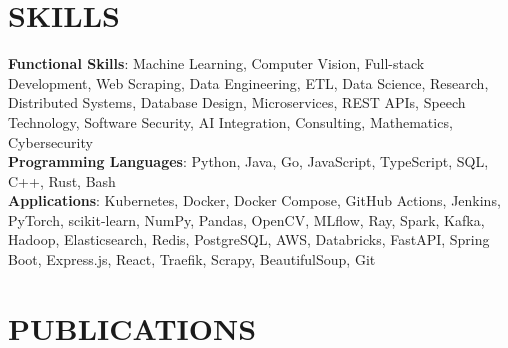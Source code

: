 \documentclass[10pt, letterpaper]{article}
\begin{document}
\section*{SKILLS}

\textbf{Functional Skills}: Machine Learning, Computer Vision, Full-stack Development, Web Scraping, Data Engineering, ETL, Data Science, Research, Distributed Systems, Database Design, Microservices, REST APIs, Speech Technology, Software Security, AI Integration, Consulting, Mathematics, Cybersecurity \\[3pt]
\textbf{Programming Languages}: Python, Java, Go, JavaScript, TypeScript, SQL, C++, Rust, Bash \\[3pt]
\textbf{Applications}: Kubernetes, Docker, Docker Compose, GitHub Actions, Jenkins, PyTorch, scikit-learn, NumPy, Pandas, OpenCV, MLflow, Ray, Spark, Kafka, Hadoop, Elasticsearch, Redis, PostgreSQL, AWS, Databricks, FastAPI, Spring Boot, Express.js, React, Traefik, Scrapy, BeautifulSoup, Git

\newpage
\section*{PUBLICATIONS}
\end{document}
